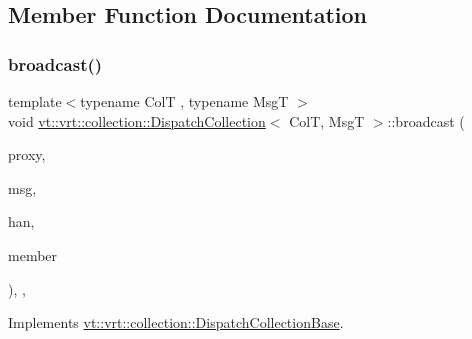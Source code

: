 \subsection{Member Function Documentation}
\mbox{\label{structvt_1_1vrt_1_1collection_1_1_dispatch_collection_aac39e73dc1609a4c865b3e69c55355ec}} 
\subsubsection{\texorpdfstring{broadcast()}{broadcast()}}
{\footnotesize\ttfamily template$<$typename ColT , typename MsgT $>$ \\
void \hyperlink{structvt_1_1vrt_1_1collection_1_1_dispatch_collection}{vt\+::vrt\+::collection\+::\+Dispatch\+Collection}$<$ ColT, MsgT $>$\+::broadcast (\begin{DoxyParamCaption}\item[{\hyperlink{namespacevt_a1b417dd5d684f045bb58a0ede70045ac}{Virtual\+Proxy\+Type}}]{proxy,  }\item[{void $\ast$}]{msg,  }\item[{\hyperlink{namespacevt_af64846b57dfcaf104da3ef6967917573}{Handler\+Type}}]{han,  }\item[{bool}]{member }\end{DoxyParamCaption})\hspace{0.3cm}{\ttfamily [override]}, {\ttfamily [private]}, {\ttfamily [virtual]}}



Implements \hyperlink{structvt_1_1vrt_1_1collection_1_1_dispatch_collection_base_aa2f5d59eefb10ba8c7ba2432efff9ad3}{vt\+::vrt\+::collection\+::\+Dispatch\+Collection\+Base}.

\mbox{\label{structvt_1_1vrt_1_1collection_1_1_dispatch_collection_af44ce95c566067f26f1b4bdf2bcb49a6}} 
